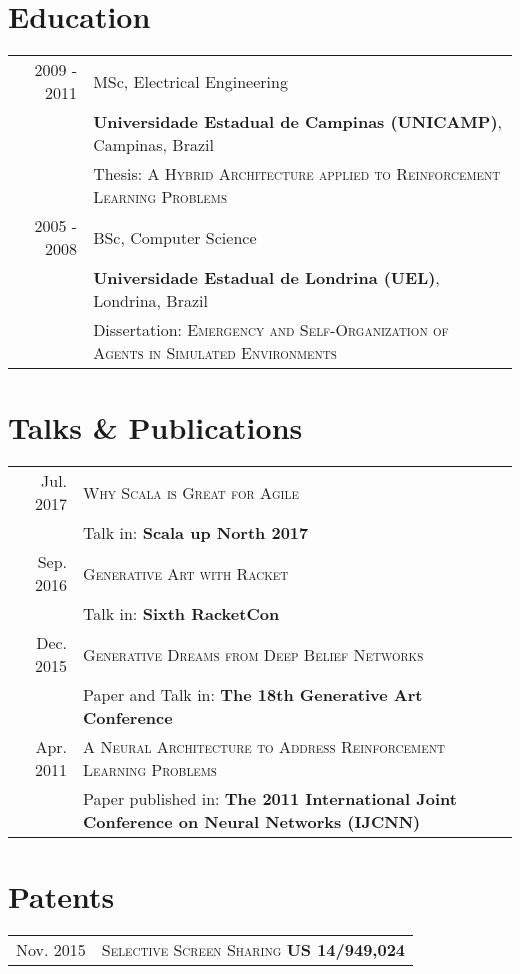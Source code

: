 \documentclass[a4paper,10pt]{article}
\begin{document}

\section{Education}
\begin{tabular}{rl}
2009 - 2011 & MSc, Electrical Engineering\\
& \textbf{Universidade Estadual de Campinas (UNICAMP)}, Campinas, Brazil\\
& Thesis: \textsc{A Hybrid Architecture applied to Reinforcement Learning Problems} \\
2005 - 2008 & BSc, Computer Science\\
& \textbf{Universidade Estadual de Londrina (UEL)}, Londrina, Brazil\\
& Dissertation: \textsc{Emergency and Self-Organization of Agents in Simulated Environments}
\end{tabular}

\section{Talks \& Publications}
\begin{tabular}{rl}
 Jul. 2017 & \textsc{Why Scala is Great for Agile}\\
 				   & Talk in: \textbf{Scala up North 2017}\\
 Sep. 2016 & \textsc{Generative Art with Racket}\\
					 & Talk in: \textbf{Sixth RacketCon}\\
 Dec. 2015 & \textsc{Generative Dreams from Deep Belief Networks}\\
 				   & Paper and Talk in: \textbf{The 18th Generative Art Conference}\\
 Apr. 2011 & \textsc{A Neural Architecture to Address Reinforcement Learning Problems}\\
 				   & Paper published in: \textbf{The 2011 International Joint Conference on Neural Networks (IJCNN)}\\
\end{tabular}

\section{Patents}
\begin{tabular}{rl}
 Nov. 2015 & \textsc{Selective Screen Sharing} \textbf{US 14/949,024}\\
\end{tabular}
\end{document}
